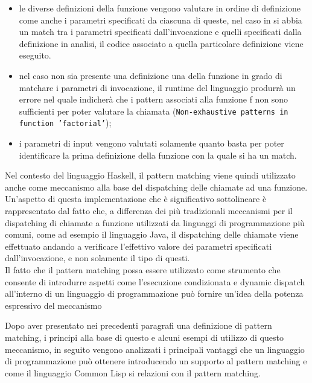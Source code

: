 \begin{itemize}

\item le diverse definizioni della funzione vengono valutare in ordine di
definizione come anche i parametri specificati da ciascuna di queste, nel caso
in si abbia un match tra i parametri specificati dall'invocazione e quelli
specificati dalla definizione in analisi, il codice associato a quella
particolare definizione viene eseguito.

\item nel caso non sia presente una definizione una della funzione in grado di
matchare i parametri di invocazione, il runtime del linguaggio produrrà un
errore nel quale indicherà che i pattern associati alla funzione f non sono
sufficienti per poter valutare la chiamata (\texttt{Non-exhaustive patterns in
function 'factorial'});

\item i parametri di input vengono valutati solamente quanto basta per poter
identificare la prima definizione della funzione con la quale si ha un match.

\end{itemize}

Nel contesto del linguaggio Haskell, il pattern matching viene quindi utilizzato
anche come meccanismo alla base del dispatching delle chiamate ad una funzione.
Un’aspetto di questa implementazione che è significativo sottolineare è
rappresentato dal fatto che, a differenza dei più tradizionali meccanismi per il
dispatching di chiamate a funzione utilizzati da linguaggi di programmazione più
comuni, come ad esempio il linguaggio Java, il dispatching delle chiamate viene
effettuato andando a verificare l’effettivo valore dei parametri specificati
dall’invocazione, e non solamente il tipo di questi.\\

Il fatto che il pattern matching possa essere utilizzato come strumento che
consente di introdurre aspetti come l’esecuzione condizionata e dynamic dispatch
all’interno di un linguaggio di programmazione può fornire un’idea della potenza
espressivo del meccanismo

Dopo aver presentato nei precedenti paragrafi una definizione di pattern
matching, i principi alla base di questo e alcuni esempi di utilizzo di questo
meccanismo, in seguito vengono analizzati i principali vantaggi che un
linguaggio di programmazione può ottenere introducendo un supporto al pattern
matching e come il linguaggio Common Lisp si relazioni con il pattern
matching.\\

